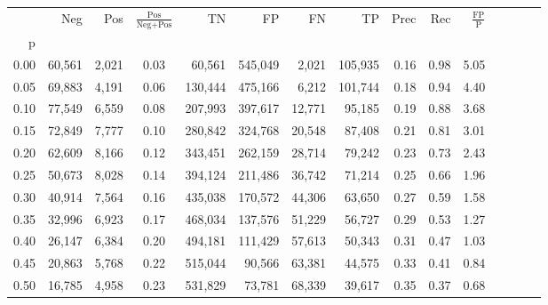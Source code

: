 \begin{tabular}{rrrcrrrrrrrrrrr}
\toprule
{} &     Neg &     Pos & $\frac{\text{Pos}}{\text{Neg}+\text{Pos}}$ &       TN &       FP &       FN &       TP &  Prec &   Rec & $\frac{\text{FP}}{\text{P}}$ \\
p    &         &         &                                            &          &          &          &          &       &       &                              \\
\midrule
0.00 &  60,561 &   2,021 &                                       0.03 &   60,561 &  545,049 &    2,021 &  105,935 &  0.16 &  0.98 &                         5.05 \\
0.05 &  69,883 &   4,191 &                                       0.06 &  130,444 &  475,166 &    6,212 &  101,744 &  0.18 &  0.94 &                         4.40 \\
0.10 &  77,549 &   6,559 &                                       0.08 &  207,993 &  397,617 &   12,771 &   95,185 &  0.19 &  0.88 &                         3.68 \\
0.15 &  72,849 &   7,777 &                                       0.10 &  280,842 &  324,768 &   20,548 &   87,408 &  0.21 &  0.81 &                         3.01 \\
0.20 &  62,609 &   8,166 &                                       0.12 &  343,451 &  262,159 &   28,714 &   79,242 &  0.23 &  0.73 &                         2.43 \\
0.25 &  50,673 &   8,028 &                                       0.14 &  394,124 &  211,486 &   36,742 &   71,214 &  0.25 &  0.66 &                         1.96 \\
0.30 &  40,914 &   7,564 &                                       0.16 &  435,038 &  170,572 &   44,306 &   63,650 &  0.27 &  0.59 &                         1.58 \\
0.35 &  32,996 &   6,923 &                                       0.17 &  468,034 &  137,576 &   51,229 &   56,727 &  0.29 &  0.53 &                         1.27 \\
0.40 &  26,147 &   6,384 &                                       0.20 &  494,181 &  111,429 &   57,613 &   50,343 &  0.31 &  0.47 &                         1.03 \\
0.45 &  20,863 &   5,768 &                                       0.22 &  515,044 &   90,566 &   63,381 &   44,575 &  0.33 &  0.41 &                         0.84 \\
0.50 &  16,785 &   4,958 &                                       0.23 &  531,829 &   73,781 &   68,339 &   39,617 &  0.35 &  0.37 &                         0.68 \\

\end{tabular}
